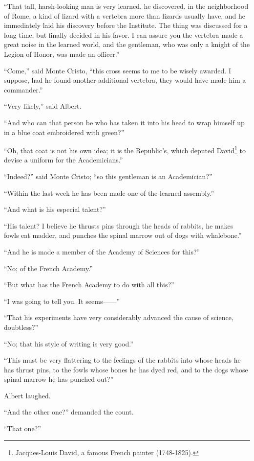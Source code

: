 “That tall, harsh-looking man is very learned, he discovered, in the
neighborhood of Rome, a kind of lizard with a vertebra more than
lizards usually have, and he immediately laid his discovery before the
Institute. The thing was discussed for a long time, but finally decided
in his favor. I can assure you the vertebra made a great noise in the
learned world, and the gentleman, who was only a knight of the Legion
of Honor, was made an officer.”

“Come,” said Monte Cristo, “this cross seems to me to be wisely
awarded. I suppose, had he found another additional vertebra, they
would have made him a commander.”

“Very likely,” said Albert.

“And who can that person be who has taken it into his head to wrap
himself up in a blue coat embroidered with green?”

“Oh, that coat is not his own idea; it is the Republic’s, which deputed
David\footnote[12]{Jacques-Louis David, a famous French painter (1748-1825).}
to devise a uniform for the Academicians.”

“Indeed?” said Monte Cristo; “so this gentleman is an Academician?”

“Within the last week he has been made one of the learned assembly.”

“And what is his especial talent?”

“His talent? I believe he thrusts pins through the heads of rabbits, he
makes fowls eat madder, and punches the spinal marrow out of dogs with
whalebone.”

“And he is made a member of the Academy of Sciences for this?”

“No; of the French Academy.”

“But what has the French Academy to do with all this?”

“I was going to tell you. It seems——”

“That his experiments have very considerably advanced the cause of
science, doubtless?”

“No; that his style of writing is very good.”

“This must be very flattering to the feelings of the rabbits into whose
heads he has thrust pins, to the fowls whose bones he has dyed red, and
to the dogs whose spinal marrow he has punched out?”

Albert laughed.

“And the other one?” demanded the count.

“That one?”

